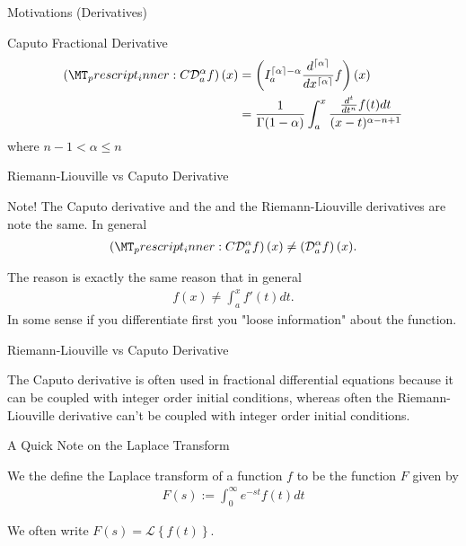 \documentclass[pdf]{beamer}
\newcommand{\laplace}[1]{ \mathcal{L} \left\{ #1 \right\} }
\newcommand{\rld}[3]{ \left( \mathcal{D}_{#1}^{#2} #3 \right) }
\newcommand{\rli}[3]{ \left( I_{#1}^{#2} #3 \right) }
\newcommand{\capder}[3]{ \left( \prescript{C}{}{\mathcal{D}_{#1}^{#2}} #3 \right) }
\begin{document}
\begin{frame}{Motivations (Derivatives)}
	\begin{block}{Caputo Fractional Derivative}
		\begin{align*}
			\capder{a}{\alpha}{f}(x) &= \rli{a}{\lceil \alpha \rceil - \alpha}{\frac{d^{\lceil \alpha \rceil}}{dx^{\lceil \alpha \rceil}}f}(x) \\
				&= \frac{1}{\Gamma(1 - \alpha)} \int_a^x \frac{\frac{d^{t}}{dt^n}f(t)dt}{(x-t)^{\alpha - n + 1}}
		\end{align*}
		where $ n - 1 < \alpha \leq n $
	\end{block}
\end{frame}

\begin{frame}{ Riemann-Liouville vs Caputo Derivative}
	\begin{alertblock}{Note!}
		The Caputo derivative and the and the Riemann-Liouville derivatives are note the same.
		In general 
		\begin{align*}
			\capder{a}{\alpha}{f}(x) \neq \rld{a}{\alpha}{f}(x).
		\end{align*}
	\end{alertblock}
	The reason is exactly the same reason that in general
	\begin{align*}
		f(x) \neq \int_a^x f'(t) dt.
	\end{align*}
	In some sense if you differentiate first you "loose information" about the function.
\end{frame}

\begin{frame}{ Riemann-Liouville vs Caputo Derivative}

	The Caputo derivative is often used in fractional differential equations because it
	can be coupled with integer order initial conditions, whereas often the Riemann-Liouville
	derivative can't be coupled with integer order initial conditions.

\end{frame}

\begin{frame}{A Quick Note on the Laplace Transform}
	\begin{definition}
		We the define the Laplace transform of a function $ f $ to be the function $ F $
		given by
		\begin{align*}
			F(s) := \int_0^\infty e^{-st} f(t) dt
		\end{align*}
	\end{definition}
	
	We often write $ F(s) = \laplace{f(t)} $.
	
\end{frame}
\end{document}
